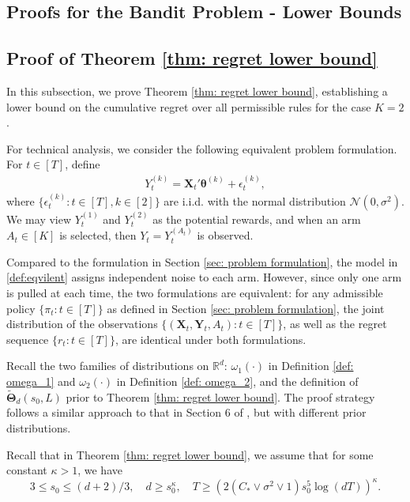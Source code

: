 \documentclass[aos,preprint]{imsart}
\theoremstyle{plain}
\theoremstyle{definition}
\newcommand{\bTheta}{\boldsymbol{\Theta}}
\newcommand{\btheta}{\boldsymbol{\theta}}
\newcommand{\bX}{\boldsymbol{X}}
\newcommand{\bY}{\boldsymbol{Y}}
\newcommand{\bR}{\mathbb{R}}
\begin{document}
\begin{appendix}
\section{Proofs for the Bandit Problem - Lower Bounds}

\subsection{Proof of Theorem \ref{thm: regret lower bound}} \label{sec: proof of cumulative regret, lower bound}
In this subsection, we prove Theorem \ref{thm: regret lower bound}, establishing a lower bound on the cumulative regret over all permissible rules for the case $K = 2$. 

For technical analysis, we consider the following equivalent problem formulation. For $t \in [T]$, define
\begin{align}\label{def:eqvilent}
    Y_{t}^{(k)} = \bX_{t}'\btheta^{(k)}  + \epsilon_{t}^{(k)},
\end{align}
where $\{\epsilon_{t}^{(k)}:t \in [T], k \in [2]\}$ are i.i.d. with the normal distribution $\mathcal{N}(0,\sigma^2)$. We may view $Y_{t}^{(1)}$ and $Y_{t}^{(2)}$ as the potential rewards, and when an arm $A_t \in [K]$ is selected, then $Y_t = Y_t^{(A_t)}$ is observed.

Compared to the formulation in Section \ref{sec: problem formulation}, the model in \eqref{def:eqvilent} assigns independent noise to each arm. However, since only one arm is pulled at each time, the two formulations are equivalent: for any admissible policy $\{\pi_t : t \in [T]\}$ as defined in Section \ref{sec: problem formulation}, the joint distribution of the observations $\{(\bX_t, \bY_t, A_t) : t \in [T]\}$, as well as the regret sequence $\{r_t : t \in [T]\}$, are identical under both formulations.

Recall the two families of distributions on $\bR^{d}$: $\omega_1(\cdot)$ in Definition \ref{def: omega_1} and $\omega_2(\cdot)$ in Definition \ref{def: omega_2}, and  the definition of $\widetilde{\bTheta}_{d}(s_0,L)$ prior to Theorem \ref{thm: regret lower bound}. The proof strategy follows a similar approach to that in Section 6 of \cite{song2022truncated}, but with different prior distributions.

Recall that in Theorem \ref{thm: regret lower bound}, we assume that for some constant $\kappa > 1$, we have
\begin{equation}\label{app_eq: regret lower bound 1}
3 \leq s_0 \leq (d+2)/3, \quad  d \geq s_0^{\kappa}, \quad 
T \geq \left( 2 (C_{*} \vee \sigma^2 \vee 1) s_0^5 \log(dT)\right)^{\kappa}.
\end{equation}


\end{appendix}
\end{document}
